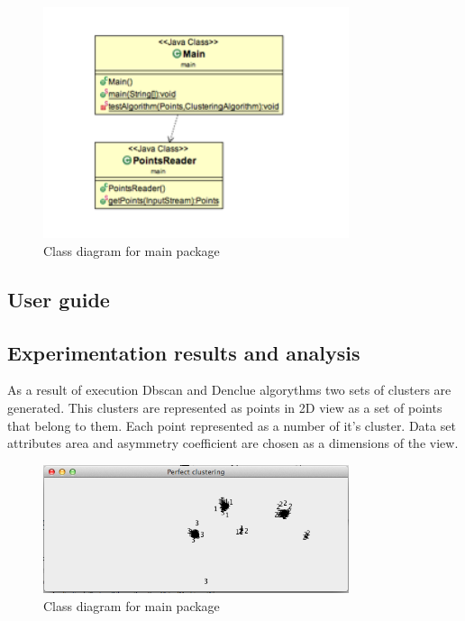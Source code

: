 \documentclass[12pt, a4paper, notitlepage, oneside]{article}
\begin{document}
\begin{itemize}
	\begin{figure}[!ht]
 	\centering
	\includegraphics[width=0.8\textwidth]{images/main_package.png}
 	\caption[]
	{Class diagram for main package}
	\end{figure}


\end{itemize}


\subsection*{User guide}

\subsection*{Experimentation results and analysis}

As a result of execution Dbscan and Denclue algorythms two sets of clusters are generated. This clusters are represented as points in 2D view as a set of points that belong to them. Each point represented as a number of it’s cluster. Data set attributes area and asymmetry coefficient are chosen as a dimensions of the view.

\begin{figure}[!ht]
 	\centering
	\includegraphics[width=0.8\textwidth]{images/perfect.png}
 	\caption[]
	{Class diagram for main package}
	\end{figure}
\end{document}
